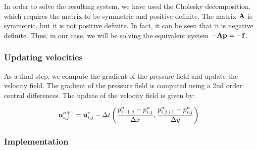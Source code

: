 In order to solve the resulting system, we have used the Cholesky decomposition, which requires the matrix to be symmetric and positive definite. The matrix $\boldsymbol{\mathrm{A}}$ is symmetric, but it is not positive definite. In fact, it can be seen that it is negative definite. Thus, in our case, we will be solving the equivalent system $-\boldsymbol{\mathrm{A}} \boldsymbol{\mathrm{p}} = -\boldsymbol{\mathrm{f}}$.


\subsubsection*{Updating velocities}

As a final step, we compute the gradient of the pressure field and update the velocity field. The gradient of the pressure field is computed using a 2nd order central differences. The update of the velocity field is given by:

\begin{equation*}
  \boldsymbol{\mathrm{u}}_{i,j}^{n+1} = \boldsymbol{\mathrm{u}}_{i,j}^* - \Delta t \left(
  \frac{p_{i+1,j}^{n} - p_{i,j}^{n}}{\Delta x}, \frac{p_{i,j+1}^{n} - p_{i,j}^{n}}{\Delta y}
  \right)
\end{equation*}

\subsubsection*{Implementation}

